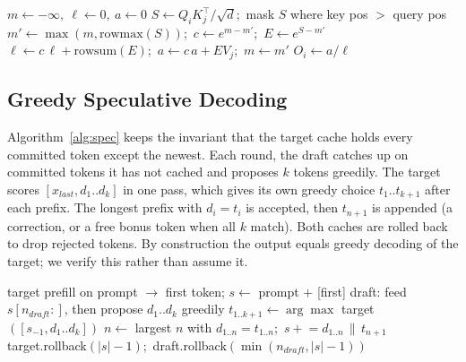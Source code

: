 \documentclass[conference]{IEEEtran}
\begin{document}
\begin{algorithm}[t]
\caption{Tiled causal attention with online softmax}
\label{alg:tiled}
\footnotesize
\begin{algorithmic}[1]
  \State $m\gets-\infty,\ \ell\gets 0,\ a\gets 0$
    \State $S\gets Q_iK_j^\top/\sqrt d$;\ mask $S$ where key pos $>$ query pos
    \State $m'\gets\max(m,\mathrm{rowmax}(S))$;\ $c\gets e^{m-m'}$;\ $E\gets e^{S-m'}$
    \State $\ell\gets c\,\ell+\mathrm{rowsum}(E)$;\ $a\gets c\,a+EV_j$;\ $m\gets m'$
  \EndFor
  \State $O_i\gets a/\ell$
\EndFor
\end{algorithmic}
\end{algorithm}

\subsection{Greedy Speculative Decoding}
Algorithm~\ref{alg:spec} keeps the invariant that the target cache holds every committed token except the newest. Each round, the draft catches up on committed tokens it has not cached and proposes $k$ tokens greedily. The target scores $[x_{last}, d_1..d_k]$ in one pass, which gives its own greedy choice $t_1..t_{k+1}$ after each prefix. The longest prefix with $d_i=t_i$ is accepted, then $t_{n+1}$ is appended (a correction, or a free bonus token when all $k$ match). Both caches are rolled back to drop rejected tokens. By construction the output equals greedy decoding of the target; we verify this rather than assume it.

\begin{algorithm}[t]
\caption{Greedy speculative decoding with cache rollback}
\label{alg:spec}
\footnotesize
\begin{algorithmic}[1]
\State target prefill on prompt $\rightarrow$ first token; $s\gets$ prompt $+$ [first]
  \State draft: feed $s[n_{draft}:]$, then propose $d_1..d_k$ greedily
  \State $t_{1..k+1}\gets\arg\max$ target$([s_{-1},d_1..d_k])$ 
  \State $n\gets$ largest $n$ with $d_{1..n}=t_{1..n}$;\ $s\mathrel{+}=d_{1..n}\,\|\,t_{n+1}$
  \State target.rollback$(|s|-1)$;\ draft.rollback$(\min(n_{draft},|s|-1))$
\EndWhile
\end{algorithmic}
\end{algorithm}
\end{document}
